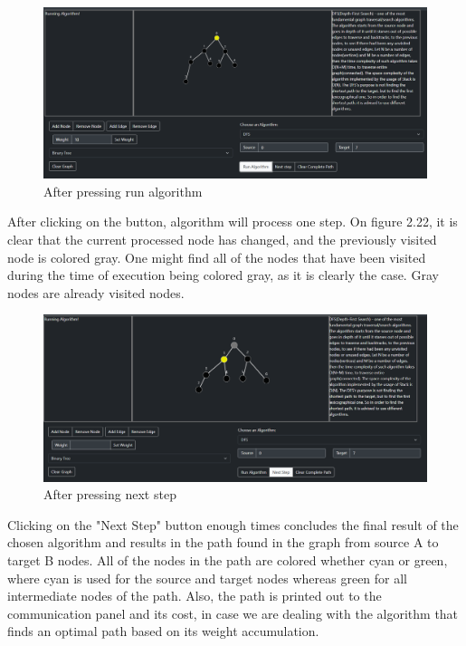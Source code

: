 \begin{figure}[H]
	\centering
	\includegraphics[width=\textwidth]{images/pressed_run_algo.png}
	\caption{After pressing run algorithm}
\end{figure}

After clicking on the button, algorithm will process one step. On figure 2.22, it is clear that the current processed node has changed, and the previously visited node is colored gray. One might find all of the nodes that have been visited during the time of execution being colored gray, as it is clearly the case. Gray nodes are already visited nodes.

\begin{figure}[H]
	\centering
	\includegraphics[width=\textwidth]{images/pressed_next_step.png}
	\caption{After pressing next step}
\end{figure}

Clicking on the "Next Step" button enough times concludes the final result of the chosen algorithm and results in the path found in the graph from source A to target B nodes. All of the nodes in the path are colored whether cyan or green, where cyan is used for the source and target nodes whereas green for all intermediate nodes of the path. Also, the path is printed out to the communication panel and its cost, in case we are dealing with the algorithm that finds an optimal path based on its weight accumulation.

